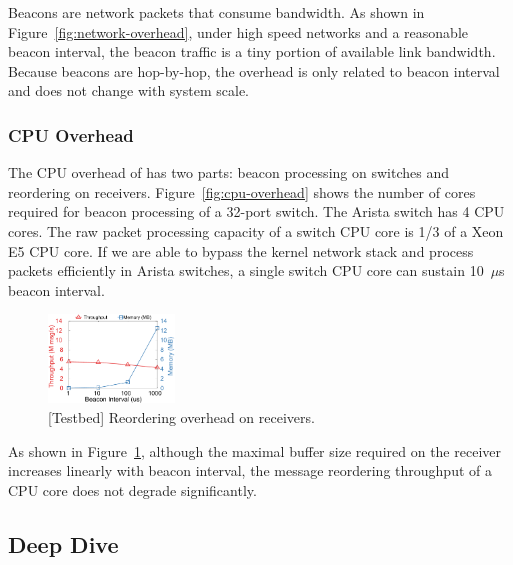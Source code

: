 
Beacons are network packets that consume bandwidth.
As shown in Figure~\ref{fig:network-overhead}, under high speed networks and a reasonable beacon interval, the beacon traffic is a tiny portion of available link bandwidth.
Because beacons are hop-by-hop, the overhead is only related to beacon interval and does not change with system scale.

\subsubsection{CPU Overhead}
\label{sec:eval-cpu-overhead}

The CPU overhead of \sys has two parts: beacon processing on switches and reordering on receivers.
Figure~\ref{fig:cpu-overhead} shows the number of cores required for beacon processing of a 32-port switch.
The Arista switch has 4 CPU cores.
The raw packet processing capacity of a switch CPU core is 1/3 of a Xeon E5 CPU core.
If we are able to bypass the kernel network stack and process packets efficiently in Arista switches, a single switch CPU core can sustain 10~$\mu$s beacon interval.


\begin{figure}[t]
\centering
\includegraphics[width=0.3\textwidth]{gnuplot/reorder_receiver.pdf}
\caption{[Testbed] Reordering overhead on receivers.}
\label{fig:reorder-overhead}
\end{figure}

As shown in Figure~\ref{fig:reorder-overhead}, although the maximal buffer size required on the receiver increases linearly with beacon interval, the message reordering throughput of a CPU core does not degrade significantly.

\subsection{Deep Dive}

